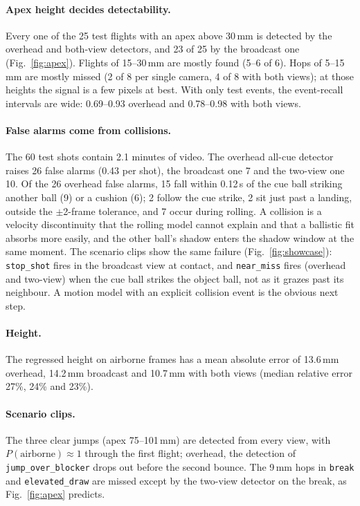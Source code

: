 \documentclass[11pt]{article}
\begin{document}
\paragraph{Apex height decides detectability.}
Every one of the 25 test flights with an apex above 30\,mm is detected by the
overhead and both-view detectors, and 23 of 25 by the broadcast one
(Fig.~\ref{fig:apex}). Flights of 15--30\,mm are mostly found (5--6 of 6).
Hops of 5--15\,mm are mostly missed (2 of 8 per single camera, 4 of 8 with both
views); at those heights the signal is a few pixels at best. With only
\NumEvents{} test events, the event-recall intervals are wide: 0.69--0.93 overhead
and 0.78--0.98 with both views.

\paragraph{False alarms come from collisions.}
The 60 test shots contain 2.1 minutes of video. The overhead all-cue detector
raises 26 false alarms (0.43 per shot), the broadcast one 7 and the two-view
one 10. Of the 26 overhead false alarms, 15 fall within 0.12\,s of the cue ball
striking another ball (9) or a cushion (6); 2 follow the cue strike, 2 sit just
past a landing, outside the $\pm$2-frame tolerance, and 7 occur during
rolling. A collision is a velocity discontinuity that the rolling model cannot
explain and that a ballistic fit absorbs more easily, and the other ball's
shadow enters the shadow window at the same moment. The scenario clips show the
same failure (Fig.~\ref{fig:showcase}): \texttt{stop\_shot} fires in the
broadcast view at contact, and \texttt{near\_miss} fires (overhead and two-view)
when the cue ball strikes the object ball, not as it grazes past its neighbour.
A motion model with an
explicit collision event is the obvious next step.

\paragraph{Height.}
The regressed height on airborne frames has a mean absolute error of 13.6\,mm
overhead, 14.2\,mm broadcast and 10.7\,mm with both views (median relative
error 27\%, 24\% and 23\%).

\paragraph{Scenario clips.}
The three clear jumps (apex 75--101\,mm) are detected from every view, with
$P(\text{airborne})\approx 1$ through the first flight; overhead, the
detection of \texttt{jump\_over\_blocker} drops out before the second bounce. The
9\,mm hops in \texttt{break} and \texttt{elevated\_draw} are missed except by the
two-view detector on the break, as Fig.~\ref{fig:apex} predicts.
\end{document}
